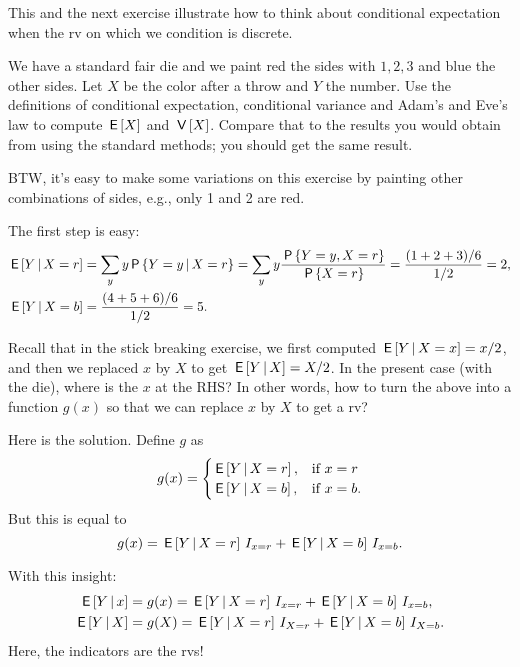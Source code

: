 \documentclass[lectures]{subfiles}
\begin{document}
This and the next exercise illustrate how to think about conditional expectation when the rv on which we condition is discrete.

\begin{exercise}
We have a standard fair die and we paint red the sides with $1, 2, 3$ and blue the other sides.
Let $X$ be the color after a throw and $Y$ the number.
Use the definitions of conditional expectation, conditional variance and Adam's and Eve's law to compute $\,\mathsf{E}\left[X\right]$ and $\,\mathsf{V}\left[X\right]$.
Compare that to the results you would obtain from using the standard methods; you should get the same result.

BTW, it's easy to make some variations on this exercise by painting other combinations of sides, e.g., only 1 and 2 are red.
\begin{solution}
The first step is easy:
\begin{align}
\,\mathsf{E}\left[Y\,\middle|\, X=r\right] &= \sum_{y} y \,\mathsf{P}\left\{Y=y\,\middle|\, X=r\right\} = \sum_{y} y \frac{\,\mathsf{P}\left\{Y=y,  X=r\right\}}{\,\mathsf{P}\left\{X=r\right\}} = \frac{(1+2+3)/6}{1/2}  = 2, \\
\,\mathsf{E}\left[Y\,\middle|\, X=b\right] &= \frac{(4 + 5+ 6)/6}{1/2}  = 5.
\end{align}

Recall that in the stick breaking exercise, we first computed $\,\mathsf{E}\left[Y\,\middle|\, X = x\right] = x/2$, and then we replaced $x$ by $X$ to get $\,\mathsf{E}\left[Y\,\middle|\, X\right] = X/2$. In the present case (with the die), where is the $x$ at the RHS? In other words, how to turn the above into a function $g(x)$ so that we can replace $x$ by $X$ to get a rv?


Here is the solution. Define $g$ as
\begin{equation}
  \label{eq:111}
  g(x) =
  \begin{cases}
    \,\mathsf{E}\left[Y\,\middle|\, X=r\right], & \text{if } x = r \\
    \,\mathsf{E}\left[Y\,\middle|\, X=b\right], & \text{if } x = b.
  \end{cases}
\end{equation}
But this is equal to
\begin{equation}
  \label{eq:112}
  g(x) = \,\mathsf{E}\left[Y\,\middle|\, X=r\right] \,I_{x=r} + \,\mathsf{E}\left[Y\,\middle|\, X=b\right] \,I_{x=b}.
\end{equation}

With this insight:
\begin{align*}
\,\mathsf{E}\left[Y\,\middle|\, x\right] &=  g(x) = \,\mathsf{E}\left[Y\,\middle|\, X=r\right] \,I_{x=r} + \,\mathsf{E}\left[Y\,\middle|\, X=b\right] \,I_{x=b}, \\
\,\mathsf{E}\left[Y\,\middle|\, X\right] &=  g(X) = \,\mathsf{E}\left[Y\,\middle|\, X=r\right] \,I_{X=r} + \,\mathsf{E}\left[Y\,\middle|\, X=b\right] \,I_{X=b}.
\end{align*}
Here, the indicators are the rvs!


\end{solution}
\end{exercise}
\end{document}
